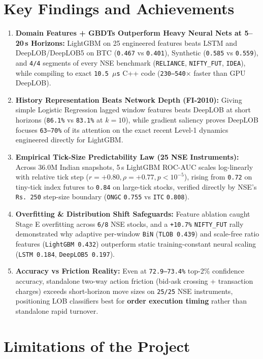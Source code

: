 \documentclass[12pt,a4paper,oneside]{report}
\newcommand{\code}[1]{\texttt{#1}}
\begin{document}
\section{Key Findings and Achievements}

\begin{enumerate}
  \item \textbf{Domain Features + GBDTs Outperform Heavy Neural Nets at 5--20\,s Horizons:} LightGBM on 25 engineered features beats LSTM and DeepLOB/DeepLOB5 on BTC (\code{0.467} vs \code{0.401}), Synthetic (\code{0.585} vs \code{0.559}), and \code{4/4} segments of every NSE benchmark (\code{RELIANCE}, \code{NIFTY\_FUT}, \code{IDEA}), while compiling to exact \code{10.5\,$\mu$s} C++ code (\code{230--540$\times$} faster than GPU DeepLOB).
  \item \textbf{History Representation Beats Network Depth (FI-2010):} Giving simple Logistic Regression lagged window features beats DeepLOB at short horizons (\code{86.1\%} vs \code{83.1\%} at $k=10$), while gradient saliency proves DeepLOB focuses \code{63--70\%} of its attention on the exact recent Level-1 dynamics engineered directly for LightGBM.
  \item \textbf{Empirical Tick-Size Predictability Law (25 NSE Instruments):} Across 36.0M Indian snapshots, 5\,s LightGBM ROC-AUC scales log-linearly with relative tick step ($r = +0.80, \rho = +0.77, p < 10^{-5}$), rising from \code{0.72} on tiny-tick index futures to \code{0.84} on large-tick stocks, verified directly by NSE's \code{Rs. 250} step-size boundary (\code{ONGC} \code{0.755} vs \code{ITC} \code{0.808}).
  \item \textbf{Overfitting \& Distribution Shift Safeguards:} Feature ablation caught Stage E overfitting across \code{6/8} NSE stocks, and a \code{+10.7\%} \code{NIFTY\_FUT} rally demonstrated why adaptive per-window \code{BiN} (\code{TLOB 0.439}) and scale-free ratio features (\code{LightGBM 0.432}) outperform static training-constant neural scaling (\code{LSTM 0.184}, \code{DeepLOB5 0.197}).
  \item \textbf{Accuracy vs Friction Reality:} Even at \code{72.9--73.4\%} top-2\% confidence accuracy, standalone two-way action friction (bid-ask crossing + transaction charges) exceeds short-horizon move sizes on \code{25/25} NSE instruments, positioning LOB classifiers best for \textbf{order execution timing} rather than standalone rapid turnover.
\end{enumerate}

\section{Limitations of the Project}
\end{document}
